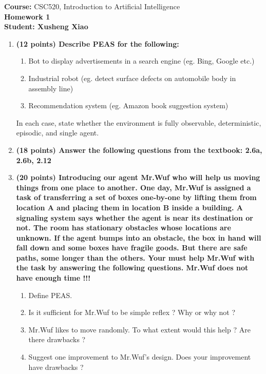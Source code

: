\documentclass{article}%
\begin{document}
\begin{flushleft}
\textbf{Course:} CSC520, Introduction to Artificial Intelligence\\
\textbf{Homework 1}\\
\textbf{Student: Xusheng Xiao}
\end{flushleft}

\noindent{\hrulefill}

\bigskip

\begin{enumerate}
	\item \textbf{ (12 points) Describe PEAS for the following:}
	\begin{enumerate}
	\item Bot to display advertisements in a search engine (eg. Bing, Google etc.)
	\item Industrial robot (eg. detect surface defects on automobile body in assembly line)
	\item Recommendation system (eg. Amazon book suggestion system)
	\end{enumerate}
     
     In each case, state whether the environment is fully observable, deterministic, episodic, and single agent. 


\item \textbf{(18 points) Answer the following questions from the textbook: 2.6a, 2.6b, 2.12}

\item \textbf{(20 points) Introducing our agent Mr.Wuf who will help us moving things from one place to another. One day, Mr.Wuf is assigned a task of transferring a set of boxes one-by-one by lifting them from location A and placing them in location B inside a building. A signaling system says whether the agent is near its destination or not. The room has stationary obstacles whose locations are unknown. If the agent bumps into an obstacle, the box in hand will fall down and some boxes have fragile goods. But there are safe paths, some longer than the others. Your must help Mr.Wuf with the task by answering the following questions. Mr.Wuf does not have enough time !!!}

	\begin{enumerate}
	\item Define PEAS.
	\item Is it sufficient for Mr.Wuf to be simple reflex ? Why or why not ?
	\item Mr.Wuf likes to move randomly. To what extent would this help ? Are there drawbacks ?
	\item Suggest one improvement to Mr.Wuf's design. Does your improvement have drawbacks ?
	\end{enumerate}
	

\end{enumerate}
\end{document}
